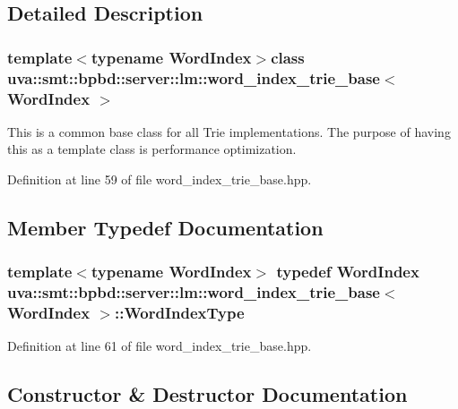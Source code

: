 \subsection{Detailed Description}
\subsubsection*{template$<$typename Word\+Index$>$class uva\+::smt\+::bpbd\+::server\+::lm\+::word\+\_\+index\+\_\+trie\+\_\+base$<$ Word\+Index $>$}

This is a common base class for all Trie implementations. The purpose of having this as a template class is performance optimization. 

Definition at line 59 of file word\+\_\+index\+\_\+trie\+\_\+base.\+hpp.



\subsection{Member Typedef Documentation}
\hypertarget{classuva_1_1smt_1_1bpbd_1_1server_1_1lm_1_1word__index__trie__base_a64279b5b94c421b25aedaa72e73d013c}{}
\subsubsection[{Word\+Index\+Type}]{\setlength{\rightskip}{0pt plus 5cm}template$<$typename Word\+Index$>$ typedef Word\+Index {\bf uva\+::smt\+::bpbd\+::server\+::lm\+::word\+\_\+index\+\_\+trie\+\_\+base}$<$ Word\+Index $>$\+::{\bf Word\+Index\+Type}}\label{classuva_1_1smt_1_1bpbd_1_1server_1_1lm_1_1word__index__trie__base_a64279b5b94c421b25aedaa72e73d013c}


Definition at line 61 of file word\+\_\+index\+\_\+trie\+\_\+base.\+hpp.



\subsection{Constructor \& Destructor Documentation}
\hypertarget{classuva_1_1smt_1_1bpbd_1_1server_1_1lm_1_1word__index__trie__base_a7b7f68670ef02b7359b6a1a68ed6b437}{}
